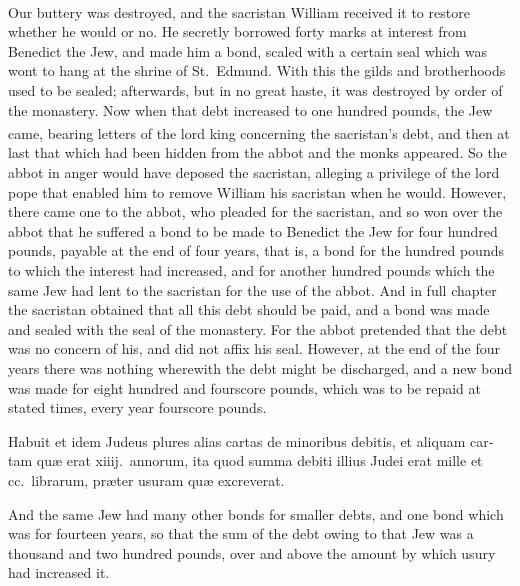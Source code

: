 \documentclass[10pt]{book}
\newcounter{engnote}
\newcommand{\engnotenum}{\textsuperscript{\arabic{engnote}\stepcounter{engnote}}}
\begin{document}
\begin{paracol}{2}
Our buttery was destroyed, and the sacristan William\engnotenum{} received it to restore whether he would or no. He secretly borrowed forty marks at interest from Benedict the Jew, and made him a bond, scaled with a certain seal which was wont to hang at the shrine of St.\ Edmund. With this the gilds and brotherhoods used to be sealed; afterwards, but in no great haste, it was destroyed by order of the monastery. Now when that debt increased to one hundred pounds, the Jew came, bearing letters of the lord king\engnotenum{} concerning the sacristan's debt, and then at last that which had been hidden from the abbot and the monks appeared. So the abbot in anger would have deposed the sacristan, alleging a privilege of the lord pope that enabled him to remove William his sacristan when he would. However, there came one to the abbot, who pleaded for the sacristan, and so won over the abbot that he suffered a bond to be made to Benedict the Jew for four hundred pounds, payable at the end of four years, that is, a bond for the hundred pounds to which the interest had increased, and for another hundred pounds which the same Jew had lent to the sacristan for the use of the abbot. And in full chapter the sacristan obtained that all this debt should be paid, and a bond was made and sealed with the seal of the monastery. For the abbot pretended that the debt was no concern of his, and did not affix his seal. However, at the end of the four years there was nothing wherewith the debt might be discharged, and a new bond was made for eight hundred and fourscore pounds, which was to be repaid at stated times, every year fourscore pounds.

\switchcolumn*

\begin{otherlanguage}{latin}
Habuit et idem Judeus plures alias cartas de minoribus debitis, et aliquam cartam qu\ae{} erat xiiij.\ annorum, ita quod summa debiti illius Judei erat mille et cc.\ librarum, pr\ae{}ter usuram qu\ae{} excreverat.
\end{otherlanguage}

\switchcolumn

And the same Jew had many other bonds for smaller debts, and one bond which was for fourteen years, so that the sum of the debt owing to that Jew was a thousand and two hundred pounds, over and above the amount by which usury had increased it.

\switchcolumn*


\end{paracol}
\end{document}
